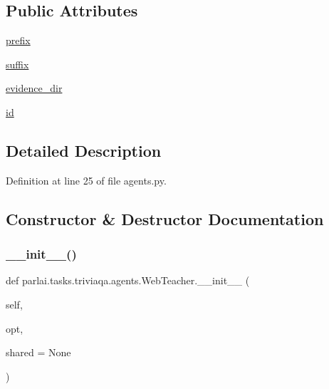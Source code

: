 \subsection*{Public Attributes}
\begin{DoxyCompactItemize}
\item 
\hyperlink{classparlai_1_1tasks_1_1triviaqa_1_1agents_1_1WebTeacher_ab62932f9cf9704abc101d924f279a8a1}{prefix}
\item 
\hyperlink{classparlai_1_1tasks_1_1triviaqa_1_1agents_1_1WebTeacher_adfa79e6153ab8900eff1853bba6def9c}{suffix}
\item 
\hyperlink{classparlai_1_1tasks_1_1triviaqa_1_1agents_1_1WebTeacher_a290c1e778391be704efed2dfe06bed25}{evidence\+\_\+dir}
\item 
\hyperlink{classparlai_1_1tasks_1_1triviaqa_1_1agents_1_1WebTeacher_aa997ce2a0c127b3cfc6391a0472fa9d3}{id}
\end{DoxyCompactItemize}


\subsection{Detailed Description}


Definition at line 25 of file agents.\+py.



\subsection{Constructor \& Destructor Documentation}
\mbox{\label{classparlai_1_1tasks_1_1triviaqa_1_1agents_1_1WebTeacher_a13bb3abbde8cd219d61e2093d38f7210}} 
\subsubsection{\texorpdfstring{\+\_\+\+\_\+init\+\_\+\+\_\+()}{\_\_init\_\_()}}
{\footnotesize\ttfamily def parlai.\+tasks.\+triviaqa.\+agents.\+Web\+Teacher.\+\_\+\+\_\+init\+\_\+\+\_\+ (\begin{DoxyParamCaption}\item[{}]{self,  }\item[{}]{opt,  }\item[{}]{shared = {\ttfamily None} }\end{DoxyParamCaption})}




